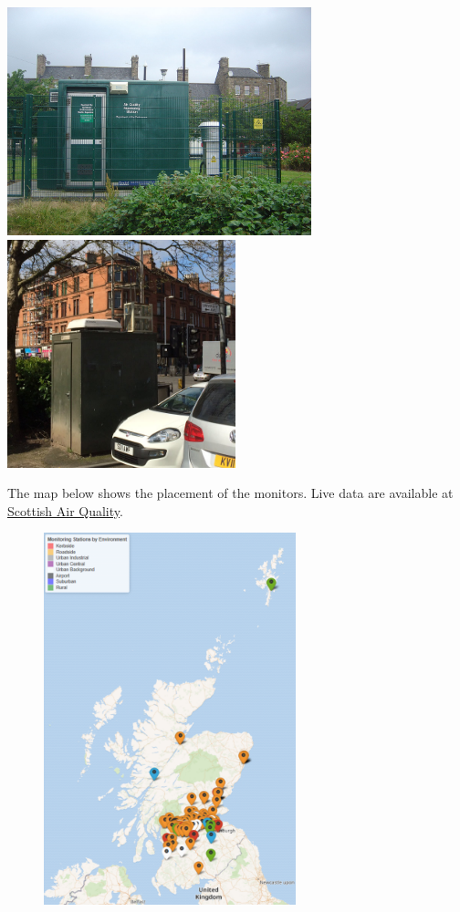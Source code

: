 \documentclass[
  letterpaper,
  DIV=11,
  numbers=noendperiod]{scrartcl}
\begin{document}
\begin{tcolorbox}
\includegraphics[width=\textwidth,height=2.60417in]{images/EdinburghStation.jpg}
\includegraphics[width=\textwidth,height=2.60417in]{images/GlasgowStation.jpg}

The map below shows the placement of the monitors. Live data are
available at \href{http://www.scottishairquality.scot/}{Scottish Air
Quality}.

\begin{figure}[H]

{\centering \includegraphics[width=2.875in,height=\textheight]{images/Monitor4.png}

}
\end{figure}
\end{tcolorbox}
\end{document}
